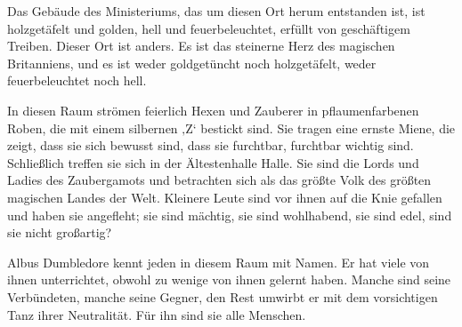 Das Gebäude des Ministeriums, das um diesen Ort herum entstanden ist, ist holzgetäfelt und golden, hell und feuerbeleuchtet, erfüllt von geschäftigem Treiben. Dieser Ort ist anders. Es ist das steinerne Herz des magischen Britanniens, und es ist weder goldgetüncht noch holzgetäfelt, weder feuerbeleuchtet noch hell.

In diesen Raum strömen feierlich Hexen und Zauberer in pflaumenfarbenen Roben, die mit einem silbernen ‚Z‘ bestickt sind. Sie tragen eine ernste Miene, die zeigt, dass sie sich bewusst sind, dass sie furchtbar, furchtbar wichtig sind. Schließlich treffen sie sich in der Ältestenhalle Halle. Sie sind die Lords und Ladies des Zaubergamots und betrachten sich als das größte Volk des größten magischen Landes der Welt. Kleinere Leute sind vor ihnen auf die Knie gefallen und haben sie angefleht; sie sind mächtig, sie sind wohlhabend, sie sind edel, sind sie nicht großartig?

Albus Dumbledore kennt jeden in diesem Raum mit Namen. Er hat viele von ihnen unterrichtet, obwohl zu wenige von ihnen gelernt haben. Manche sind seine Verbündeten, manche seine Gegner, den Rest umwirbt er mit dem vorsichtigen Tanz ihrer Neutralität. Für ihn sind sie alle Menschen.

